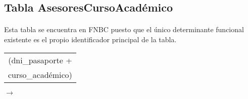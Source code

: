 \subsection{Tabla AsesoresCursoAcadémico}

  \paragraph{}Esta tabla se encuentra en FNBC puesto que el único
  determinante funcional existente es el propio identificador principal
  de la tabla.

 \begin{center}
    \begin{minipage}{4.2cm}{\begin{flushright}\begin{tabular}{ | c | }
                  \hline
                  (dni\_pasaporte + \\
                  curso\_académico) \\
                  \hline
                 \end{tabular}\end{flushright} }
    \end{minipage}
    \begin{minipage}{0.7cm}{$\longrightarrow$}
    \end{minipage}
    \begin{minipage}{5.9cm}{\begin{tabular}{ | c | }
                  \hline
                  \\
                  \hline
                 \end{tabular} }
    \end{minipage}
  \end{center}
